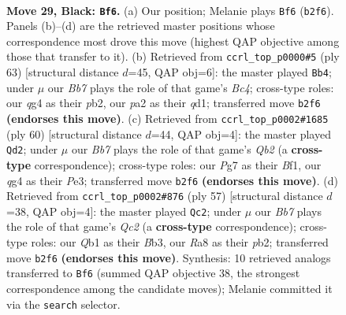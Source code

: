 \documentclass[11pt]{article}
\begin{document}
\clearpage

\begin{figure}[p]\centering
\begin{subfigure}{0.46\textwidth}\centering
\resizebox{\linewidth}{!}{%
\newchessgame
\chessboard[
  setfen={r7/2p1k1pp/3p4/6B1/pP4Q1/6P1/Pb3PKP/1q6 b - - 4 29},
  showmover=false,
  pgfstyle=straightmove, color=movearrow, markmove={b2-f6}
]}
\caption{}
\end{subfigure}\hfill
\begin{subfigure}{0.46\textwidth}\centering
\resizebox{\linewidth}{!}{%
\newchessgame
\chessboard[
  setfen={6k1/5pp1/4p3/1qb4p/4P3/2B2PP1/1P4KP/3Q4 b - - 14 32},
  showmover=false,
  pgfstyle=straightmove, color=movearrow, markmove={c5-b4}
]}
\caption{}
\end{subfigure}
\\[4pt]
\begin{subfigure}{0.46\textwidth}\centering
\resizebox{\linewidth}{!}{%
\newchessgame
\chessboard[
  setfen={8/2p1q1pk/6np/B4p2/4b3/4P2P/1Q3PPK/5B2 w - - 1 31},
  showmover=false,
  pgfstyle=straightmove, color=movearrow, markmove={b2-d2}
]}
\caption{}
\end{subfigure}\hfill
\begin{subfigure}{0.46\textwidth}\centering
\resizebox{\linewidth}{!}{%
\newchessgame
\chessboard[
  setfen={6k1/1pq2pp1/7p/8/3BP3/1b3P1P/1P1Q2P1/7K b - - 8 29},
  showmover=false,
  pgfstyle=straightmove, color=movearrow, markmove={c7-c2}
]}
\caption{}
\end{subfigure}
\caption{\textbf{Move 29, Black: \texttt{Bf6}.} (a) Our position; Melanie plays \texttt{Bf6} (\texttt{b2f6}). Panels (b)--(d) are the retrieved master positions whose correspondence most drove this move (highest QAP objective among those that transfer to it). (b) Retrieved from \texttt{ccrl\_top\_p0000\#5} (ply 63) [structural distance $d$=45, QAP obj=6]: the master played \texttt{Bb4}; under $\mu$ our \emph{Bb7} plays the role of that game's \emph{Bc4}; cross-type roles: our \emph{q}g4 as their \emph{p}b2, our \emph{p}a2 as their \emph{q}d1; transferred move \texttt{b2f6} \textbf{(endorses this move)}. (c) Retrieved from \texttt{ccrl\_top\_p0002\#1685} (ply 60) [structural distance $d$=44, QAP obj=4]: the master played \texttt{Qd2}; under $\mu$ our \emph{Bb7} plays the role of that game's \emph{Qb2} (a \textbf{cross-type} correspondence); cross-type roles: our \emph{P}g7 as their \emph{B}f1, our \emph{q}g4 as their \emph{P}e3; transferred move \texttt{b2f6} \textbf{(endorses this move)}. (d) Retrieved from \texttt{ccrl\_top\_p0002\#876} (ply 57) [structural distance $d$=38, QAP obj=4]: the master played \texttt{Qc2}; under $\mu$ our \emph{Bb7} plays the role of that game's \emph{Qc2} (a \textbf{cross-type} correspondence); cross-type roles: our \emph{Q}b1 as their \emph{B}b3, our \emph{R}a8 as their \emph{p}b2; transferred move \texttt{b2f6} \textbf{(endorses this move)}. Synthesis: 10 retrieved analogs transferred to \texttt{Bf6} (summed QAP objective 38, the strongest correspondence among the candidate moves); Melanie committed it via the \texttt{search} selector.}
\label{fig:thought-m57}
\end{figure}
\end{document}
